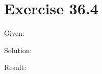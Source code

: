 \documentclass[a4paper, 10pt]{scrartcl}
\begin{document}
\section{Exercise 36.4}

Given:

Solution:

Result:
\end{document}
